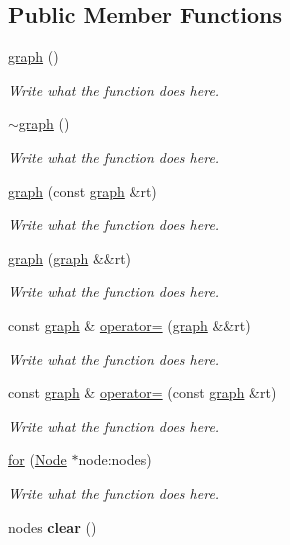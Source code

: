 \subsection*{Public Member Functions}
\begin{DoxyCompactItemize}
\item 
\hyperlink{classgraph_af87b66e0c5abea18db06492c14adb5fb}{graph} ()
\begin{DoxyCompactList}\small\item\em Write what the function does here. \end{DoxyCompactList}\item 
\hyperlink{classgraph_a86a49b0dd6f2fbbdab4a044bb29e4a2a}{$\sim$graph} ()
\begin{DoxyCompactList}\small\item\em Write what the function does here. \end{DoxyCompactList}\item 
\hyperlink{classgraph_a0544402982f793695fb9cc071600b4b9}{graph} (const \hyperlink{classgraph}{graph} \&rt)
\begin{DoxyCompactList}\small\item\em Write what the function does here. \end{DoxyCompactList}\item 
\hyperlink{classgraph_a9353a5e27c35250f323b6f2bf7c14c40}{graph} (\hyperlink{classgraph}{graph} \&\&rt)
\begin{DoxyCompactList}\small\item\em Write what the function does here. \end{DoxyCompactList}\item 
const \hyperlink{classgraph}{graph} \& \hyperlink{classgraph_a08ffaf262ac16616c296d1b3c3c31559}{operator=} (\hyperlink{classgraph}{graph} \&\&rt)
\begin{DoxyCompactList}\small\item\em Write what the function does here. \end{DoxyCompactList}\item 
const \hyperlink{classgraph}{graph} \& \hyperlink{classgraph_aeb9dc4e35433477ab6c722eedaefd293}{operator=} (const \hyperlink{classgraph}{graph} \&rt)
\begin{DoxyCompactList}\small\item\em Write what the function does here. \end{DoxyCompactList}\item 
\hyperlink{classgraph_aafc813abfabbfede592fb20fb9778810}{for} (\hyperlink{structgraph_1_1Node}{Node} $\ast$node\+:nodes)
\begin{DoxyCompactList}\small\item\em Write what the function does here. \end{DoxyCompactList}\item 
\hypertarget{classgraph_a01203511b1874cab424a585c35603d81}{nodes {\bfseries clear} ()}\label{classgraph_a01203511b1874cab424a585c35603d81}


\end{DoxyCompactItemize}
